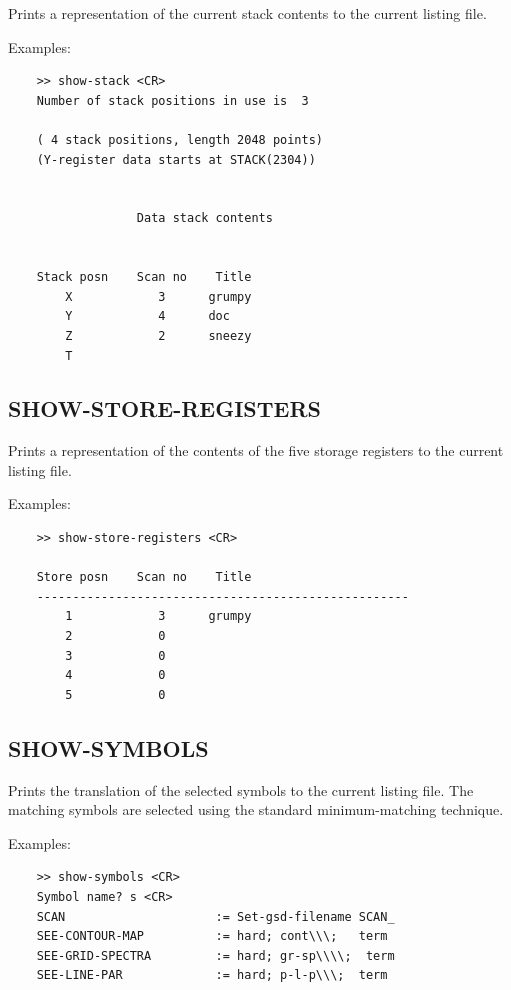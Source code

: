 \documentclass[11pt,twoside]{report}
\begin{document}
Prints a representation of the current stack contents to the current
listing file.

Examples:
\begin{verbatim}
    >> show-stack <CR>
    Number of stack positions in use is  3

    ( 4 stack positions, length 2048 points)
    (Y-register data starts at STACK(2304))


                  Data stack contents


    Stack posn    Scan no    Title
        X            3      grumpy
        Y            4      doc
        Z            2      sneezy
        T
\end{verbatim}

\subsection{SHOW-STORE-REGISTERS} 

Prints a representation of the contents of the five storage registers
to the current listing file.

Examples:
\begin{verbatim}
    >> show-store-registers <CR>

    Store posn    Scan no    Title
    ----------------------------------------------------
        1            3      grumpy
        2            0
        3            0
        4            0
        5            0
\end{verbatim}

\subsection{SHOW-SYMBOLS} 

Prints the translation of the selected symbols to the current
listing file. The matching symbols are selected using the standard
minimum-matching technique.

Examples:
\begin{verbatim}
    >> show-symbols <CR>
    Symbol name? s <CR>
    SCAN                     := Set-gsd-filename SCAN_
    SEE-CONTOUR-MAP          := hard; cont\\\;   term
    SEE-GRID-SPECTRA         := hard; gr-sp\\\\;  term
    SEE-LINE-PAR             := hard; p-l-p\\\;  term
\end{verbatim}
\end{document}
